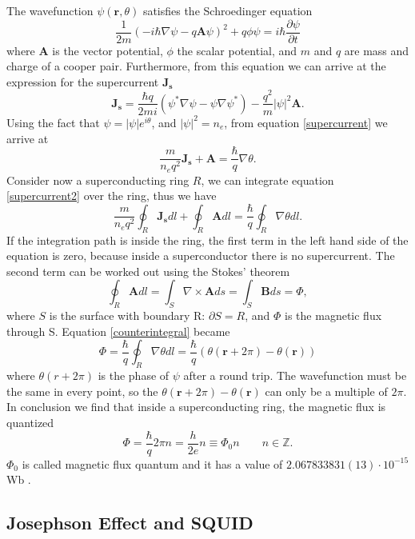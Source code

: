 \documentclass[a4paper,10pt]{article}
\begin{document}
The wavefunction $\psi(\mathbf{r},\theta)$ satisfies the Schroedinger equation \cite{fluxquantization}
\begin{equation}\frac{1}{2m}\left(-i\hbar\nabla\psi - q\mathbf{A}\psi \right)^2 + q\phi \psi = i\hbar\frac{\partial \psi }{\partial t}\end{equation}
where $\mathbf{A}$ is the vector potential, $\phi$ the scalar potential, and $m$ and $q$ are mass and charge of a cooper pair. Furthermore, from this equation we can arrive at the expression for the supercurrent $\mathbf{J_s}$
\begin{equation}\label{supercurrent}\mathbf{J_s} = \frac{\hbar q}{2mi}\left(\psi^* \nabla \psi - \psi \nabla \psi^*\right) -\frac{q^2}{m}|\psi|^2\mathbf{A}.\end{equation}
Using the fact that $\psi = |\psi| e^{i\theta}$, and $|\psi|^2 = n_e$, from equation \eqref{supercurrent} we arrive at
\begin{equation}\label{supercurrent2}
\frac{m}{n_eq^2} \mathbf{J_s} + \mathbf{A} = \frac{\hbar}{q}\nabla\theta.
\end{equation}
Consider now a superconducting ring $R$, we can integrate equation \eqref{supercurrent2} over the ring, thus we have
\begin{equation}\label{counterintegral}\frac{m}{n_eq^2}\oint_R \mathbf{J_s} dl + \oint_R \mathbf{A}dl = \frac{\hbar}{q}\oint_R\nabla\theta dl.\end{equation}
If the integration path is inside the ring, the first term in the left hand side of the equation is zero, because inside a superconductor there is no supercurrent. The second term can be worked out using the Stokes' theorem
\[\oint_R \mathbf{A}dl = \int_S \nabla \times \mathbf{\mathbf{A}}ds = \int_S \mathbf{B} ds = \Phi,\]
where $S$ is the surface with boundary R: $\partial S = R$, and $\Phi$ is the magnetic flux through S. Equation \eqref{counterintegral} became
\[\Phi = \frac{\hbar}{q}\oint_R\nabla\theta dl = \frac{\hbar}{q}\left(\theta(\mathbf{r}+2\pi) - \theta(\mathbf{r})\right)\]
where $\theta(r+2\pi)$ is the phase of $\psi$ after a round trip. The wavefunction must be the same in every point, so the $\theta(\mathbf{r}+2\pi) - \theta(\mathbf{r})$ can only be a multiple of $2\pi$. In conclusion we find that inside a superconducting ring, the magnetic flux is quantized
\[\Phi = \frac{\hbar}{q} 2\pi n = \frac{h}{2e} n \equiv \Phi_0 n \qquad n\in \mathbb{Z}.\]
$\Phi_0$ is called magnetic flux quantum and it has a value of $2.067833831(13)\cdot 10^{-15}$ Wb \cite{magneticfluxquantum}.
\subsection{Josephson Effect and SQUID} %
\end{document}
